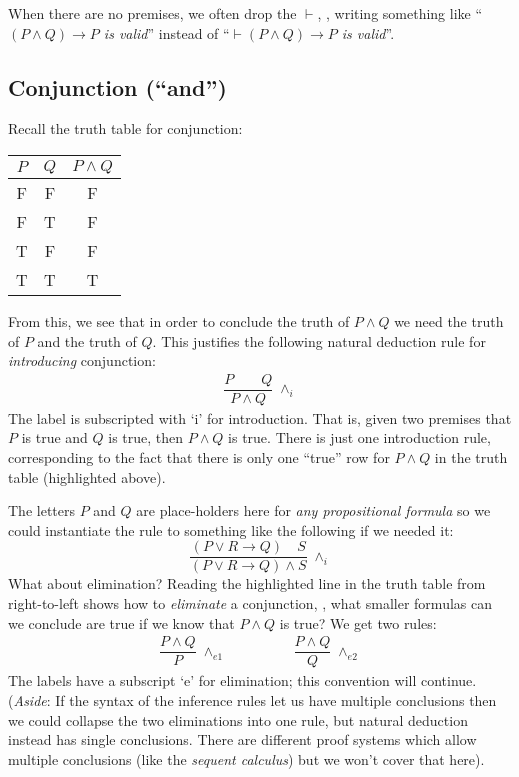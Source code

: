 When there are no premises, we often drop the $\vdash$, \ie{},
writing something like ``\emph{$(P \wedge Q) \rightarrow P$ is valid}''
instead of ``\emph{$\vdash (P \wedge Q) \rightarrow P$ is
valid}''.

\subsection{Conjunction (``and'')}

Recall the truth table for conjunction:
%
\begin{center}
\begin{tabular}{cc|c}
  $P$ & $Q$ & $P \wedge Q$ \\ \hline
  F & F & F \\
  F & T & F \\
  T & F & F \\
\rowcolor{yellow}  T & T & T
\end{tabular}
\end{center}
%
From this, we see that in order to conclude the truth of $P \wedge Q$
we need the truth of $P$ and the truth of $Q$. This justifies the
following natural deduction rule for \emph{introducing} conjunction:
%
\begin{align*}
  \dfrac{P \qquad Q}
        {P \wedge Q} \; {\wedge_i}
\end{align*}
%
The label is subscripted with `i' for introduction.
That is, given two premises that $P$ is true and $Q$ is true, then
$P \wedge Q$ is true. There is just one introduction rule,
corresponding to the fact that there is only one ``true'' row
for $P \wedge Q$ in the truth table (highlighted above).

The letters $P$ and $Q$ are place-holders here for \emph{any
  propositional formula} so we could instantiate the rule
to something like the following if we needed it:
%
\begin{equation*}
\dfrac{(P \vee R \rightarrow Q) \quad S}
      {(P \vee R \rightarrow Q) \wedge S} \; {\wedge_i}
\end{equation*}
%
What about elimination?
Reading the highlighted line in the truth table from right-to-left shows how to
\emph{eliminate} a conjunction, \ie{}, what smaller formulas
can we conclude are true if we know that $P \wedge Q$ is true? We get
two rules:
%
\begin{align*}
  \dfrac{P \wedge Q}
        {P} \; {\wedge_{e1}}
  \qquad & \qquad
      \dfrac{P \wedge Q}
        {Q} \; {\wedge_{e2}}
\end{align*}
%
The labels have a subscript `e' for elimination; this convention will
continue.  (\emph{Aside}: If the syntax of the inference rules let us
have multiple conclusions then we could collapse the two eliminations
into one rule, but natural deduction instead has single
conclusions. There are different proof systems which allow
multiple conclusions (like the \emph{sequent calculus}) but we won't cover that here).

